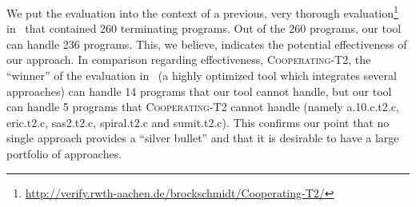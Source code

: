 We put the evaluation into the context of a previous, very thorough evaluation\footnote{\url{http://verify.rwth-aachen.de/brockschmidt/Cooperating-T2/}} in~\cite{conf/cav/BrockschmidtCF13} that contained 260 terminating programs.
Out of the 260 programs, our tool can handle 236 programs. This, we believe, indicates the potential effectiveness of our approach.
In comparison regarding effectiveness, \textsc{Cooperating-T2}, the “winner” of the evaluation in~\cite{conf/cav/BrockschmidtCF13} (a highly optimized tool which integrates several approaches) can handle 14 programs that our tool cannot handle, but our tool can handle 5 programs that \textsc{Cooperating-T2} cannot handle (namely \textsf{\small a.10.c.t2.c}, \textsf{\small eric.t2.c}, \textsf{\small sas2.t2.c}, \textsf{\small spiral.t2.c} and \textsf{\small sumit.t2.c}). This confirms our point that no single approach provides a ``silver bullet'' and that it is desirable to have a large portfolio of approaches.




